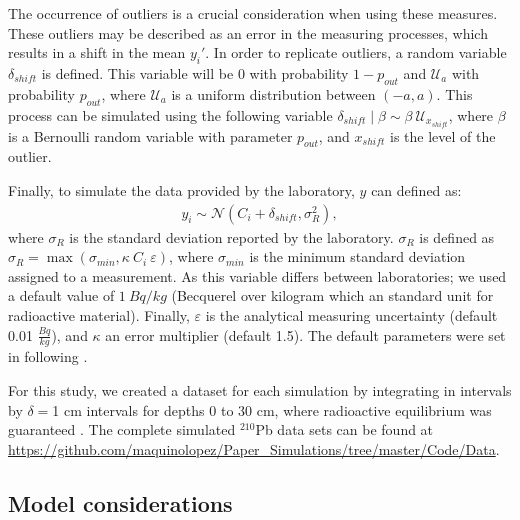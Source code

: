 \documentclass [10pt] {article}
\begin{document}
The occurrence of outliers is a crucial consideration when using these measures.
These outliers may be described as an error in the measuring processes, which results in a shift in the mean $y_i'$.
In order to replicate outliers, a random variable $\delta_{shift}$ is defined.
This variable will be $0$ with probability $1-p_{out}$ and $\mathcal{U}_a$ with probability $p_{out}$, where $\mathcal{U}_a$ is a uniform distribution between $(-a,a)$.
This process can be simulated using the following variable $\delta_{shift}\mid\beta \sim \beta\ \mathcal{U}_{x_{shift}}$, where $\beta$ is a Bernoulli random variable with parameter $p_{out}$, and $x_{shift}$ is the level of the outlier. 

Finally, to simulate the data provided by the laboratory, $y$ can defined as:   
\begin{align}
	y_i\sim\mathcal{N}\left(C_{i} + \delta_{shift}, \sigma^2_{R} \right), 
\end{align}
where $\sigma_R$ is the standard deviation reported by the laboratory. 
$\sigma_R$ is defined as $\sigma_R= \max \left(\sigma_{min}, \kappa~C_i ~\varepsilon \right)$, where $\sigma_{min}$ is the minimum standard deviation assigned to a measurement. As this variable differs between laboratories; we used a default value of $1~ Bq/kg$ (Becquerel over kilogram which an standard unit for radioactive material). 
Finally, $\varepsilon$ is the analytical measuring uncertainty (default 0.01 $\frac{Bq}{kg}$), and $\kappa$ an error multiplier (default 1.5).
The default parameters were set in following \citet{Blaauw2018}.


For this study, we created a dataset for each simulation by integrating in intervals by $\delta =$1 cm intervals for depths 0 to 30 cm, where radioactive equilibrium was guaranteed \citep{Aquino2018}.
The complete simulated $^{210}$Pb data sets can be found at \url{https://github.com/maquinolopez/Paper\_Simulations/tree/master/Code/Data}.

\subsection{Model considerations}
\end{document}
